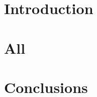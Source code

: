 



\newpage
\pagestyle{plain}
\setcounter{page}{1}    %

\section{Introduction}
\newpage
\section{All}
\newpage
\section{Conclusions}\label{Sec:Conc}





% 


